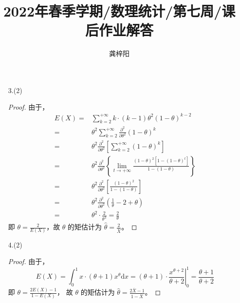 \documentclass[normal,cn]{elegantnote}
\title{2022年春季学期/数理统计/第七周/课后作业解答}
\author{龚梓阳}
\date{\zhtoday}
\begin{document}
\maketitle
\begin{enumerate}
    \item[3.(2)]
        \begin{proof}
            由于，
            \begin{equation*}
                \begin{aligned}
                    E(X)= & \sum_{k=2}^{+\infty}k\cdot(k-1)\theta^{2}(1-\theta)^{k-2}                                                                                                             \\
                    =     & \theta^{2}\sum_{k=2}^{+\infty} \frac{\partial^{2}}{\partial\theta^{2}}(1-\theta)^{k}                                                                                  \\
                    =     & \theta^{2}\frac{\partial^{2}}{\partial\theta^{2}}\left[\sum_{k=2}^{+\infty}(1-\theta)^{k}\right]                                                                      \\
                    =     & \theta^{2}\frac{\partial^{2}}{\partial\theta^{2}}\left\{\lim_{t\rightarrow+\infty}\frac{(1-\theta)^{2}\left[1-\left(1-\theta\right)^{t}\right]}{1-(1-\theta)}\right\} \\
                    =     & \theta^{2}\frac{\partial^{2}}{\partial\theta^{2}}\left[\frac{(1-\theta)^{2}}{1-(1-\theta)}\right]                                                                     \\
                    =     & \theta^{2}\frac{\partial^{2}}{\partial\theta^{2}}\left(\frac{1}{\theta}-2+\theta\right)                                                                               \\
                    =     & \theta^{2}\cdot\frac{2}{\theta^{3}}=\frac{2}{\theta}
                \end{aligned}
            \end{equation*}
            即 $\theta=\frac{2}{E(X)}$，故 $\theta$ 的矩估计为 $\hat{\theta}=\frac{2}{\bar{X}}$。
        \end{proof}

    \item[4.(2)]
        \begin{proof}
            由于，
            \begin{equation*}
                E(X)=\int_{0}^{1}x\cdot(\theta+1)x^{\theta}\mathrm{d}x=\left.(\theta+1)\cdot\frac{x^{\theta+2}}{\theta+2}\right|_{0}^{1}=\frac{\theta+1}{\theta+2}
            \end{equation*}
            即 $\theta=\frac{2E(X)-1}{1-E(X)}$，
            故 $\theta$ 的矩估计为 $\hat{\theta}=\frac{2\bar{X}-1}{1-\bar{X}}$。
        \end{proof}


\end{enumerate}
\end{document}
